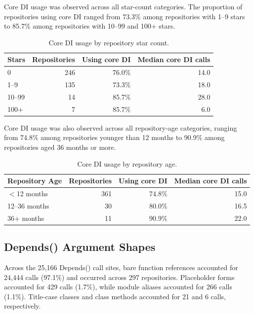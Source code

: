 Core DI usage was observed across all star-count categories. The proportion of repositories using core DI ranged from 73.3\% among repositories with 1--9 stars to 85.7\% among repositories with 10--99 and 100+ stars.

\begin{table}[!t]
\centering
\caption{Core DI usage by repository star count.}
\label{tab:stars}
\begin{tabular}{@{}lrrr@{}}
\toprule
\textbf{Stars} & \textbf{Repositories} & \textbf{Using core DI} & \textbf{Median core DI calls} \\
\midrule
0 & 246 & 76.0\% & 14.0 \\
1--9 & 135 & 73.3\% & 18.0 \\
10--99 & 14 & 85.7\% & 28.0 \\
100+ & 7 & 85.7\% & 6.0 \\
\bottomrule
\end{tabular}
\end{table}

Core DI usage was also observed across all repository-age categories, ranging from 74.8\% among repositories younger than 12 months to 90.9\% among repositories aged 36 months or more.

\begin{table}[!t]
\centering
\caption{Core DI usage by repository age.}
\label{tab:age}
\begin{tabular}{@{}lrrr@{}}
\toprule
\textbf{Repository Age} & \textbf{Repositories} & \textbf{Using core DI} & \textbf{Median core DI calls} \\
\midrule
$<$12 months & 361 & 74.8\% & 15.0 \\
12--36 months & 30 & 80.0\% & 16.5 \\
36+ months & 11 & 90.9\% & 22.0 \\
\bottomrule
\end{tabular}
\end{table}

\subsection{Depends() Argument Shapes}

Across the 25,166 Depends() call sites, bare function references accounted for 24,444 calls (97.1\%) and occurred across 297 repositories. Placeholder forms accounted for 429 calls (1.7\%), while module aliases accounted for 266 calls (1.1\%). Title-case classes and class methods accounted for 21 and 6 calls, respectively.

